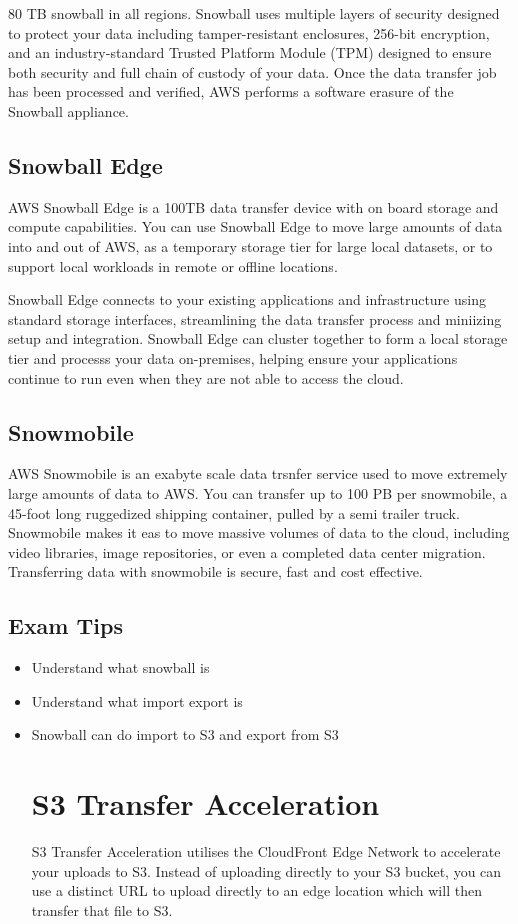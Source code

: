 \documentclass{article}
\begin{document}
80 TB snowball in all regions. Snowball uses multiple layers of security designed to protect your data including tamper-resistant enclosures, 256-bit encryption, and an industry-standard Trusted Platform Module (TPM) designed to ensure both security and full chain of custody of your data. Once the data transfer job has been processed and verified, AWS performs a software erasure of the Snowball appliance.

\subsection{Snowball Edge}
AWS Snowball Edge is a 100TB data transfer device with on board storage and compute capabilities. You can use Snowball Edge to move large amounts of data into and out of AWS, as a temporary storage tier for large local datasets, or to support local workloads in remote or offline locations.

Snowball Edge connects to your existing applications and infrastructure using standard storage interfaces, streamlining the data transfer process and miniizing setup and integration. Snowball Edge can cluster together to form a local storage tier and processs your data on-premises, helping ensure your applications continue to run even when they are not able to access the cloud.

\subsection{Snowmobile}
AWS Snowmobile is an exabyte scale data trsnfer service used to move extremely large amounts of data to AWS. You can transfer up to 100 PB per snowmobile, a 45-foot long ruggedized shipping container, pulled by a semi trailer truck. Snowmobile makes it eas to move massive volumes of data to the cloud, including video libraries, image repositories, or even a completed data center migration. Transferring data with snowmobile is secure, fast and cost effective.

\subsection*{Exam Tips}
\begin{itemize}
\item
Understand what snowball is

\item
Understand what import export is

\item
Snowball can do import to S3 and export from S3

\section{S3 Transfer Acceleration}
S3 Transfer Acceleration utilises the CloudFront Edge Network to accelerate your uploads to S3. Instead of uploading directly to your S3 bucket, you can use a distinct URL to upload directly to an edge location which will then transfer that file to S3. 

\end{itemize}
\end{document}
